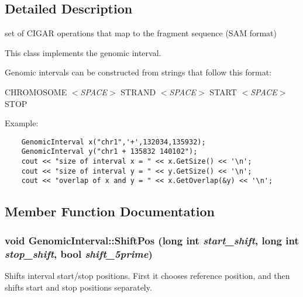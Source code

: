 \subsection{Detailed Description}
set of CIGAR operations that map to the fragment sequence (SAM format) 

This class implements the genomic interval.

Genomic intervals can be constructed from strings that follow this format:

CHROMOSOME {\em $<$SPACE$>$\/} STRAND {\em $<$SPACE$>$\/} START {\em $<$SPACE$>$\/} STOP

Example: 

\begin{Code}\begin{verbatim}    GenomicInterval x("chr1",'+',132034,135932);
    GenomicInterval y("chr1 + 135832 140102");
    cout << "size of interval x = " << x.GetSize() << '\n';
    cout << "size of interval y = " << y.GetSize() << '\n';
    cout << "overlap of x and y = " << x.GetOverlap(&y) << '\n';    
\end{verbatim}
\end{Code}

 

\subsection{Member Function Documentation}
\hypertarget{classGenomicInterval_5cc57eb991cca3f1e1b8bd7ca8acaa03}{
\subsubsection[ShiftPos]{\setlength{\rightskip}{0pt plus 5cm}void GenomicInterval::ShiftPos (long int {\em start\_\-shift}, \/  long int {\em stop\_\-shift}, \/  bool {\em shift\_\-5prime})}}
\label{classGenomicInterval_5cc57eb991cca3f1e1b8bd7ca8acaa03}


Shifts interval start/stop positions. First it chooses reference position, and then shifts start and stop positions separately. 

